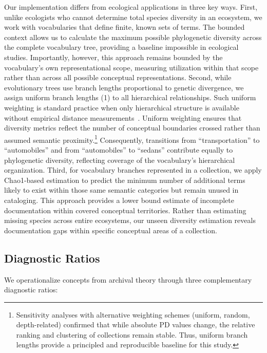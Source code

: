 \documentclass[final]{anthology-ch}
\begin{document}
Our implementation differs from ecological applications in three key ways. First, unlike ecologists who cannot determine total species diversity in an ecosystem, we work with vocabularies that define finite, known sets of terms. The bounded context allows us to calculate the maximum possible phylogenetic diversity across the complete vocabulary tree, providing a baseline impossible in ecological studies. Importantly, however, this approach remains bounded by the vocabulary's own representational scope, measuring utilization within that scope rather than across all possible conceptual representations. 
%
Second, while evolutionary trees use branch lengths proportional to genetic divergence, we assign uniform branch lengths (1) to all hierarchical relationships. Such uniform weighting is standard practice when only hierarchical structure is available without empirical distance measurements~\cite{faithConservationEvaluationPhylogenetic1992, chaoDecipheringEnigmaUndetected2017}. Uniform weighting ensures that diversity metrics reflect the number of conceptual boundaries crossed rather than assumed semantic proximity.\footnote{Sensitivity analyses with alternative weighting schemes (uniform, random, depth-related) confirmed that while absolute PD values change, the relative ranking and clustering of collections remain stable. Thus, uniform branch lengths provide a principled and reproducible baseline for this study.} Consequently, transitions from ``transportation'' to ``automobiles'' and from ``automobiles'' to ``sedans'' contribute equally to phylogenetic diversity, reflecting  coverage of the vocabulary's hierarchical organization. 
%
Third, for vocabulary branches represented in a collection, we apply Chao1-based estimation to predict the minimum number of additional terms likely to exist within those same semantic categories but remain unused in cataloging. This approach provides a lower bound estimate of incomplete documentation within covered conceptual territories. Rather than estimating missing species across entire ecosystems, our unseen diversity estimation reveals documentation gaps within specific conceptual areas of a collection.

\subsection{Diagnostic Ratios}
We operationalize concepts from archival theory through three complementary diagnostic ratios: 
\end{document}

